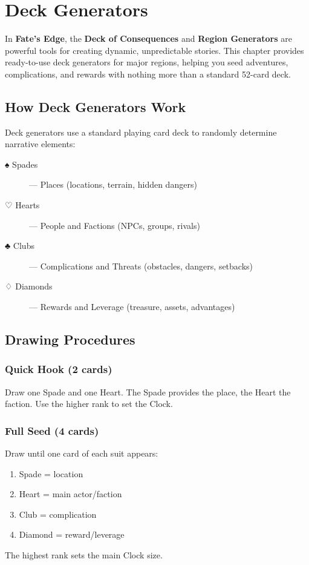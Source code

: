 
\chapter{Deck Generators}

In \textbf{Fate’s Edge}, the \textbf{Deck of Consequences} and \textbf{Region Generators} are powerful tools for creating dynamic, unpredictable stories. This chapter provides ready-to-use deck generators for major regions, helping you seed adventures, complications, and rewards with nothing more than a standard 52-card deck.

\section{How Deck Generators Work}

Deck generators use a standard playing card deck to randomly determine narrative elements:

\begin{description}
  \item[♠ Spades] — Places (locations, terrain, hidden dangers)
  \item[♡ Hearts] — People and Factions (NPCs, groups, rivals)
  \item[♣ Clubs] — Complications and Threats (obstacles, dangers, setbacks)
  \item[♢ Diamonds] — Rewards and Leverage (treasure, assets, advantages)
\end{description}

\section{Drawing Procedures}

\subsection*{Quick Hook (2 cards)}
Draw one Spade and one Heart. The Spade provides the place, the Heart the faction. Use the higher rank to set the Clock.

\subsection*{Full Seed (4 cards)}
Draw until one card of each suit appears:
\begin{enumerate}
  \item Spade = location
  \item Heart = main actor/faction
  \item Club = complication
  \item Diamond = reward/leverage
\end{enumerate}
The highest rank sets the main Clock size.

